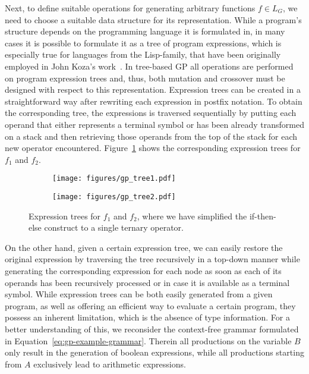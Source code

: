Next, to define suitable operations for generating arbitrary functions $f \in L_G$, we need to choose a suitable data structure for its representation.
While a program's structure depends on the programming language it is formulated in, in many cases it is possible to formulate it as a tree of program expressions, which is especially true for languages from the Lisp-family, that have been originally employed in John Koza's work~\cite{koza1994genetic}.
In tree-based GP all operations are performed on program expression trees and, thus, both mutation and crossover must be designed with respect to this representation.
Expression trees can be created in a straightforward way after rewriting each expression in postfix notation. 
To obtain the corresponding tree, the expressions is traversed sequentially by putting each operand that either represents a terminal symbol or has been already transformed on a stack and then retrieving those operands from the top of the stack for each new operator encountered.
Figure~\ref{fig:gp-expression-tree-examples} shows the corresponding expression trees for $f_1$ and $f_2$.
\begin{figure}
	\begin{subfigure}{0.59\textwidth}
		\texttt{[image: figures/gp\_tree1.pdf]}
	\end{subfigure}
	\begin{subfigure}{0.41\textwidth}
		\texttt{[image: figures/gp\_tree2.pdf]}
	\end{subfigure}
 \caption{Expression trees for $f_1$ and $f_2$, where we have simplified the if-then-else construct to a single ternary operator.}
 \label{fig:gp-expression-tree-examples}
\end{figure}
On the other hand, given a certain expression tree, we can easily restore the original expression by traversing the tree recursively in a top-down manner while generating the corresponding expression for each node as soon as each of its operands has been recursively processed or in case it is available as a terminal symbol.
While expression trees can be both easily generated from a given program, as well as offering an efficient way to evaluate a certain program, they possess an inherent limitation, which is the absence of type information.
For a better understanding of this, we reconsider the context-free grammar formulated in Equation~\eqref{eq:gp-example-grammar}.
Therein all productions on the variable $B$ only result in the generation of boolean expressions, while all productions starting from $A$ exclusively lead to arithmetic expressions.
